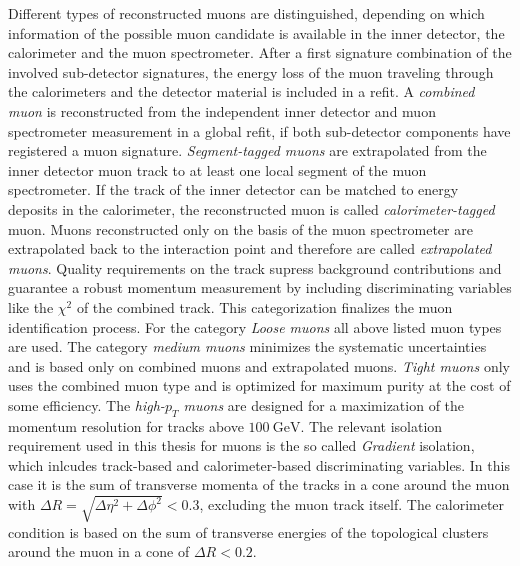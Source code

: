 Different types of reconstructed muons are distinguished, depending on which information of the possible muon candidate is available in the inner detector, the calorimeter and the muon spectrometer. After a first signature combination of the involved sub-detector signatures, the energy loss of the muon traveling through the calorimeters and the detector material is included in a refit. A \textit{combined muon} is reconstructed from the independent inner detector and muon spectrometer measurement in a global refit, if both sub-detector components have registered a muon signature. \textit{Segment-tagged muons} are extrapolated from the inner detector muon track to at least one local segment of the muon spectrometer. If the track of the inner detector can be matched to energy deposits in the calorimeter, the reconstructed muon is called \textit{calorimeter-tagged} muon. Muons reconstructed only on the basis of the muon spectrometer are extrapolated back to the interaction point and therefore are called \textit{extrapolated muons}.\cite{muPerformance}\newline
Quality requirements on the track supress background contributions and guarantee a robust momentum measurement by including discriminating variables like the $\chi^2$ of the combined track. This categorization finalizes the muon identification process. For the category \textit{Loose muons} all above listed muon types are used. The category \textit{medium muons} minimizes the systematic uncertainties and is based only on combined muons and extrapolated muons. \textit{Tight muons} only uses the combined muon type and is optimized for maximum purity at the cost of some efficiency. The \textit{high-$p_T$ muons} are designed for  a maximization of the momentum resolution for tracks above $\SI{100}{\giga\electronvolt}$. \cite{muPerformance}\newline
The relevant isolation requirement used in this thesis for muons is the so called \textit{Gradient} isolation, which inlcudes track-based and calorimeter-based discriminating variables. In this case it is the sum of transverse momenta of the tracks in a cone around the muon with $\Delta R=\sqrt{\Delta\eta^2+\Delta\phi^2}<0.3$, excluding the muon track itself. The calorimeter condition is based on the sum of transverse energies of the topological clusters around the muon in a cone of $\Delta R<0.2$. \cite{muPerformance}\cite{varcone}     
%
%
%

